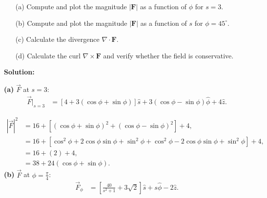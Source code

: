 \documentclass{article}
\begin{document}
\begin{itemize}
    \item[(a)] Compute and plot the magnitude $\lvert \mathbf{F} \rvert$ as a function of $\phi$ for $s = 3$.
    \item[(b)] Compute and plot the magnitude $\lvert \mathbf{F} \rvert$ as a function of $s$ for $\phi = 45^\circ$.
    \item[(c)] Calculate the divergence $\nabla \cdot \mathbf{F}$.
    \item[(d)] Calculate the curl $\nabla \times \mathbf{F}$ and verify whether the field is conservative.
\end{itemize}
\textbf{Solution:}\newline

\textbf{(a)} $\vec{F}$ at $s=3$:
\begin{align*}
\vec{F}\big|_{s=3} &= \left[ 4 + 3(\cos\phi + \sin\phi) \right] \hat{s} 
+ 3 (\cos\phi - \sin\phi) \hat{\phi} 
+ 4 \hat{z}.
\end{align*}

\begin{align*}
|\vec{F}|^2 &= 16 + \left[ (\cos\phi + \sin\phi)^2 + (\cos\phi - \sin\phi)^2 \right] + 4, \\
&= 16 + \left[ \cos^2\phi + 2\cos\phi\sin\phi + \sin^2\phi 
+ \cos^2\phi - 2\cos\phi\sin\phi + \sin^2\phi \right] + 4, \\
&= 16 + (2) + 4, \\
 &= 38 + 24 (\cos\phi + \sin\phi).
\end{align*}
\textbf{(b)} $\vec{F}$ at $\phi = \frac{\pi}{4}$:
\begin{align*}
\vec{F}_\phi &= 
    \left[ 
        \frac{40}{s^2+1} 
        + 3\sqrt{2} 
    \right] 
    \hat{s} 
    + s \hat{\phi} 
    - 2 \hat{z}.
\end{align*}
\end{document}
